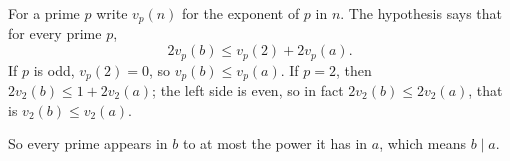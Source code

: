 For a prime $p$ write $v_p(n)$ for the exponent of $p$ in $n$. The hypothesis says that for every prime $p$,
\[2v_p(b)\le v_p(2)+2v_p(a).\]
If $p$ is odd, $v_p(2)=0$, so $v_p(b)\le v_p(a)$. If $p=2$, then $2v_2(b)\le 1+2v_2(a)$; the left side is even, so in fact $2v_2(b)\le 2v_2(a)$, that is $v_2(b)\le v_2(a)$.

So every prime appears in $b$ to at most the power it has in $a$, which means $b\mid a$.
